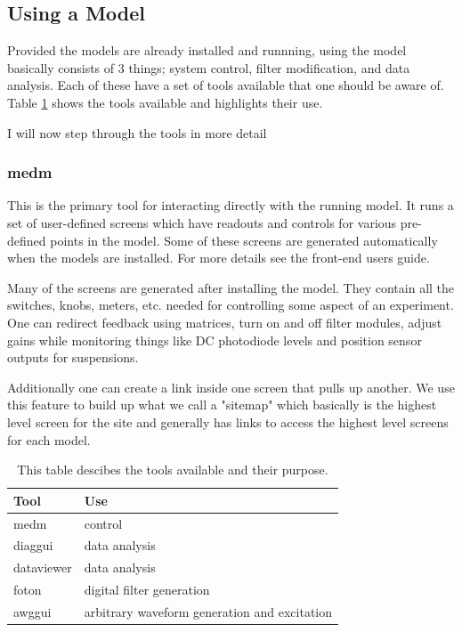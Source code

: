 \subsection{Using a Model}

Provided the models are already installed and runnning, using the model
basically consists of 3 things; system control, filter
modification, and data analysis. Each of these have a set of tools available
that one should be aware of. Table \ref{table:fetools} shows the tools available
and highlights their use.

I will now step through the tools in more detail

\subsubsection{medm}
This is the primary tool for interacting directly with the running model. It
runs a set of user-defined screens which have readouts and controls for various
pre-defined points in the model. Some of these screens are generated
automatically when the models are installed. For more details see
the front-end users guide.

Many of the screens are generated after installing the model. They contain all
the switches, knobs, meters, etc. needed for controlling some aspect of an
experiment. One can redirect feedback using matrices, turn on and off filter
modules, adjust gains while monitoring things like DC photodiode levels and
position sensor outputs for suspensions.

Additionally one can create a link inside one screen that pulls up another. We
use this feature to build up what we call a "sitemap" which basically is the
highest level screen for the site and generally has links to access the
highest level screens for each model.

\begin{table}
\begin{center}
\begin{tabular}{ | l | l | }
\hline
Tool & Use \\
\hline
medm & control \\
diaggui & data analysis \\
dataviewer & data analysis \\
foton & digital filter generation \\
awggui & arbitrary waveform generation and excitation \\
\hline
\end{tabular}
\end{center}
\caption[Front-End Tools]{This table descibes the tools available and their
purpose.
}
\label{table:fetools}
\end{table}

